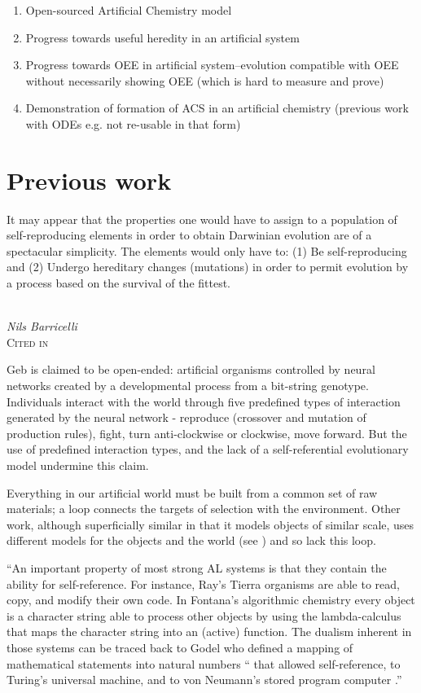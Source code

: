 \begin{enumerate}
	\item
	Open-sourced Artificial Chemistry model
	\item
	Progress towards useful heredity in an artificial system
	\item
	Progress towards OEE in artificial system--evolution compatible with
	OEE without necessarily showing OEE (which is hard to measure and
	prove)
	\item
	Demonstration of formation of ACS in an artificial chemistry (previous
	work with ODEs e.g. \parencite{Hurndall2014} not re-usable in that form)
\end{enumerate}
\chapter{Previous work}\label{previous-work}

\epigraph{%
	It may appear that the properties one would have to assign to a population of self-reproducing elements in order to obtain Darwinian evolution are of a spectacular simplicity. The elements would only have to: (1) Be self-reproducing and (2) Undergo hereditary changes (mutations) in order to permit evolution by a process based on the survival of the fittest.}%
{\textit{\\Nils Barricelli}\\\textsc{Cited in \cite{Taylor2001}}}

Geb \cite{Channon:iw,Channon:2001ly} is claimed to be open-ended: artificial organisms controlled by neural networks created by a developmental process from a bit-string genotype. Individuals interact with the world through five predefined types of interaction generated by the neural network - reproduce (crossover and mutation of production rules), fight, turn anti-clockwise or clockwise, move forward. But the use of predefined interaction types, and the lack of a self-referential evolutionary model undermine this claim.

Everything in our artificial world must be built from a common set of raw materials; a loop connects the targets of selection with the environment. Other work, although superficially similar in that it models objects of similar scale, uses different models for the objects and the world (see \parencite{Sanchez-Dehesa:2008uq}) and so lack this loop.


``An important property of most strong AL systems is that they contain the ability for self-reference. For instance, Ray's Tierra organisms are able to read, copy, and modify their own code. In Fontana's algorithmic chemistry every object is a character string able to process other objects by using the lambda-calculus that maps the character string into an (active) function. The dualism inherent in those systems can be traced back to Godel who defined a mapping of mathematical statements into natural numbers `` that allowed self-reference, to Turing's universal machine, and to von Neumann's stored program computer .''\parencite{Dittrich1998}

